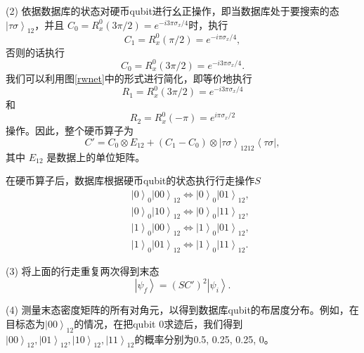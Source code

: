(2) 依据数据库的状态对硬币qubit进行幺正操作，即当数据库处于要搜索的态$\left\vert \tau\sigma \right\rangle_{12}$，并且
$C_0=R_x^0(3\pi/2)=e^{-i3\pi\sigma_x/4}$时，执行
\begin{equation}
C_1=R_x^0(\pi/2)=e^{-i\pi\sigma_x/4},
\end{equation}
否则的话执行
\begin{equation}
C_0=R_x^0(3\pi/2)=e^{-i3\pi\sigma_x/4}.
\end{equation}
我们可以利用图\ref{rwnet}中的形式进行简化，即等价地执行
\begin{equation}
R_1=R_x^0(3\pi/2)=e^{-i3\pi\sigma_x/4}
\end{equation}
和
\begin{equation}
R_2=R_x^0(-\pi)=e^{i\pi\sigma_x/2}
\end{equation}
操作。因此，整个硬币算子为
\begin{equation} \label{C'}
C'=C_0\otimes E_{12}+(C_1-C_0)\otimes\left\vert \tau\sigma
\right\rangle_{1212}\left\langle \tau\sigma \right\vert ,
\end{equation}
其中 $E_{12}$ 是数据上的单位矩阵。

在硬币算子后，数据库根据硬币qubit的状态执行行走操作$S$
\begin{eqnarray}
&&\left\vert 0 \right\rangle_{0}\left\vert 00 \right\rangle_{12}\Longleftrightarrow\left\vert 0 \right\rangle_{0}\left\vert 01 \right\rangle_{12}, \nonumber\\
&&\left\vert 0 \right\rangle_{0}\left\vert 10 \right\rangle_{12}\Longleftrightarrow\left\vert 0 \right\rangle_{0}\left\vert 11 \right\rangle_{12}, \nonumber\\
&&\left\vert 1 \right\rangle_{0}\left\vert 00 \right\rangle_{12}\Longleftrightarrow\left\vert 1 \right\rangle_{0}\left\vert 01 \right\rangle_{12}, \nonumber\\
&&\left\vert 1 \right\rangle_{0}\left\vert 01
\right\rangle_{12}\Longleftrightarrow\left\vert 1
\right\rangle_{0}\left\vert 11 \right\rangle_{12}.
\end{eqnarray}

(3) 将上面的行走重复两次得到末态
\begin{equation}
\left\vert \psi_{f} \right\rangle=\left( SC' \right)^2 \left\vert \psi_{i} \right\rangle.
\end{equation}

(4) 测量末态密度矩阵的所有对角元，以得到数据库qubit的布居度分布。例如，在目标态为${\left\vert 00 \right\rangle_{12}}$的情况，在把qubit 0求迹后，我们得到${\left\vert 00 \right\rangle_{12},\left\vert 01
\right\rangle_{12},\left\vert 10 \right\rangle_{12},\left\vert 11
\right\rangle_{12}}$的概率分别为0.5, 0.25, 0.25, 0。

